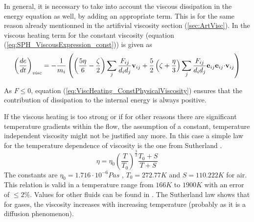 \documentclass{report}
\begin{document}
In general, it is necessary to take into account the viscous dissipation in the energy equation as well, by adding an appropriate term. This is for the same reason already mentionned in the artifivial viscosity section (\ref{sec:ArtVisc}). In \cite{Espanol2003} the viscous heating term for the constant viscosity (equation (\ref{eq:SPH_ViscousExpression_const})) is given as 
\begin{equation}
\label{eq:ViscHeating_ConstPhysicalViscosity}
 \left(\frac{de}{dt}\right)_{\mathit{visc}}=-\frac{1}{m_i}\left(\left(\frac{5\eta}{6}-\frac{\zeta}{2}\right)\sum_j\frac{F_{ij}}{d_i d_j}{\bf v}_{ij}+\frac{5}{2} \left(\zeta+\frac{\eta}{3}\right) \sum_j\frac{F_{ij}}{d_i d_j}{\bf e}_{ij} {\bf e}_{ij}{\bf \cdot v}_{ij}\right)
\end{equation}

As $ F\leq 0$, equation (\ref{eq:ViscHeating_ConstPhysicalViscosity}) ensures that the contribution of dissipation to the internal energy is always positive.

If the viscous heating is too strong or if for other reasons 
there are significant temperature gradients within the flow, the assumption of a constant, temperature independent viscosity might not be justified any more. In this case a simple law for the temperature dependence of viscosity is the one from Sutherland \cite{White1974}.
\begin{equation}
\label{eq:Sutherland_visc}
\eta=\eta_0 \left(\frac{T}{T_0}\right)^{\frac{3}{2}}\frac{T_0+S}{T+S}
\end{equation}
The constants are $\eta_0=1.716\cdot10^{-6}Pa s$
, $T_0=272.77K$ and $S=110.222K$ for air. This relation is valid in a temperature range from $166K$ to $1900K$ with an error of $\leq2\%$.
Values for other fluids can be found in \cite{White1974}. The Sutherland law shows that for gases, the viscosity increases with increasing temperature (probably as it is a diffusion phenomenon). %
\end{document}
